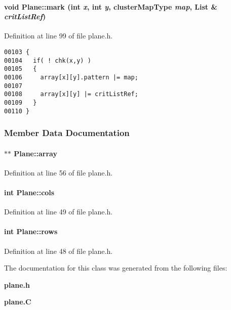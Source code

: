 \paragraph{\setlength{\rightskip}{0pt plus 5cm}void Plane::mark (int {\em x}, int {\em y}, {\bf cluster\-Map\-Type} {\em map}, {\bf List} \& {\em crit\-List\-Ref})\hspace{0.3cm}{\tt  [inline]}}\hfill



Definition at line 99 of file plane.h.\small\begin{verbatim}00103 {
00104   if( ! chk(x,y) )
00105   {
00106     array[x][y].pattern |= map;
00107 
00108     array[x][y] |= critListRef;
00109   }
00110 }
\end{verbatim}\normalsize 


\subsubsection{Member Data Documentation}
\label{Plane_o0}
\paragraph{ $\ast$$\ast$ Plane::array\hspace{0.3cm}{\tt  [private]}}\hfill



Definition at line 56 of file plane.h.\label{Plane_m1}
\paragraph{\setlength{\rightskip}{0pt plus 5cm}int Plane::cols}\hfill



Definition at line 49 of file plane.h.\label{Plane_m0}
\paragraph{\setlength{\rightskip}{0pt plus 5cm}int Plane::rows}\hfill



Definition at line 48 of file plane.h.

The documentation for this class was generated from the following files:\begin{CompactItemize}
\item 
{\bf plane.h}\item 
{\bf plane.C}\end{CompactItemize}
